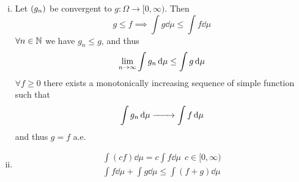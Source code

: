 \documentclass[../../script.tex]{subfiles}
\begin{document}
\begin{rem}
\begin{enumerate}[(i)]
        \item Let $\left(g_n\right)$ be convergent to $g: \Omega \rightarrow [0, \infty)$. Then 
        \[
            g \le f \implies \int g \dd{\mu} \le \int f \dd{\mu}
        \]
        $\forall n \in \mathbb{N}$ we have $g_n \le g$, and thus 
        \[
            \lim_{n \rightarrow \infty} \int g_n \dd{\mu} \le \int g \dd{\mu} 
        \]
        $\forall f \ge 0$ there exists a monotonically increasing sequence of simple function such that 
        \[
            \int g_n \dd{\mu} \conv{} \int f \dd{\mu}
        \]
        and thus $g = f$ a.e.

        \item
        \begin{align*}
            \int (cf) \dd{\mu} = c \int f \dd{\mu} ~~c \in [0, \infty) \\
            \int f \dd{\mu} + \int g \dd{\mu} \le \int (f + g) \dd{\mu}
        \end{align*}
    \end{enumerate}
\end{rem}
\end{document}
